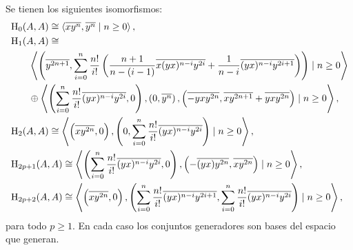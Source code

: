 \documentclass[fleqn,../tesis.tex]{subfiles}
\begin{document}
\begin{Teorema} \label{teo_homologia}
Se tienen los siguientes isomorfismos:
\begin{align*}
    		&\operatorname{H}_0(A, A) \cong \left\langle \overline{xy^n}, \overline{y^n} \mid n \geq 0 \right\rangle, \\
    		&\operatorname{H}_1(A, A) \cong \\
    		    &\qquad\left\langle \left(\overline{y^{2n + 1}},
    			\sum_{i = 0}^n\frac{n!}{i!} \left(\frac{n + 1}{n -(i - 1)}\overline{x(yx)^{n - i}y^{2i}}
    				+ \frac{1}{n - i}\overline{(yx)^{n - i}y^{2i + 1}} \right) \right) \mid n \geq 0 \right\rangle\\
    			&\qquad\oplus \left\langle \left(\sum_{i = 0}^n\frac{n!}{i!}\overline{(yx)^{n - i}y^{2i}}, 0\right),
    				\left(0, \overline{y^{n}}\right), \left(\overline{-yxy^{2n}},\overline{xy^{2n + 1}} + \overline{yxy^{2n}}\right) \mid n \geq 0 \right\rangle, \\
    		&\operatorname{H}_2(A, A) \cong \left\langle \left(\overline{xy^{2n}}, 0\right), \left(0, \sum_{i = 0}^n\frac{n!}{i!}\overline{(yx)^{n - i}y^{2i}}\right) \mid n \geq 0 \right\rangle, \\
    		&\operatorname{H}_{2p + 1}(A, A) \cong \left\langle \left(\sum_{i = 0}^n\frac{n!}{i!}\overline{(yx)^{n - i}y^{2i}}, 0\right) ,
    			\left(-\overline{(yx)y^{2n}}, \overline{xy^{2n}}\right) \mid n \geq 0 \right\rangle, \\
    		&\operatorname{H}_{2p + 2}(A, A) \cong \left\langle \left(\overline{xy^{2n}}, 0 \right) ,
    			\left(\sum_{i = 0}^n\frac{n!}{i!}\overline{(yx)^{n - i}y^{2i + 1}}, \sum_{i = 0}^n\frac{n!}{i!}\overline{(yx)^{n - i}y^{2i}}\right)\mid
    				n \geq 0 \right\rangle, \\
    \end{align*}
    para todo $p \geq 1$. En cada caso los conjuntos generadores son bases del espacio que generan.
\end{Teorema}
\end{document}

